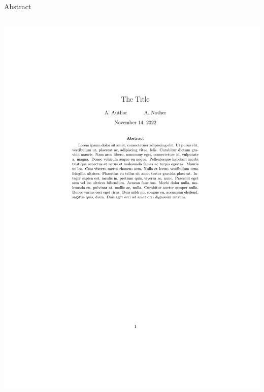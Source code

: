 \documentclass[,aspectratio=43]{beamer}
\begin{document}
\begin{frame}[fragile]{Abstract}
\begin{columns}[T]
\begin{column}{0.43\textwidth}
\begin{center}\includegraphics[width=1\linewidth]{figure/abstract} \end{center}
\end{column}
\end{columns}
\end{frame}
\end{document}
